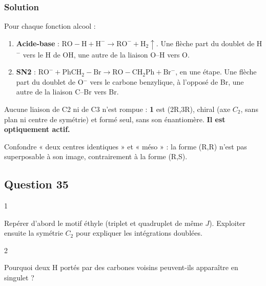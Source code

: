 \documentclass[11pt,a4paper]{article}
\providecommand{\tightlist}{\setlength{\itemsep}{0pt}\setlength{\parskip}{0pt}}
\begin{document}
\hypertarget{solution-33}{%
\subsubsection{Solution}\label{solution-33}}

Pour chaque fonction alcool :

\begin{enumerate}
\def\labelenumi{\arabic{enumi}.}
\tightlist
\item
  \textbf{Acide-base} : \(\mathrm{RO{-}H}+\mathrm{H^-}\to\mathrm{RO^-}+\mathrm{H_2}\uparrow\). Une flèche part du doublet de H\(^-\) vers le H de OH, une autre de la liaison O--H vers O.
\item
  \textbf{SN2} : \(\mathrm{RO^-}+\mathrm{PhCH_2{-}Br}\to\mathrm{RO{-}CH_2Ph}+\mathrm{Br^-}\), en une étape. Une flèche part du doublet de O\(^-\) vers le carbone benzylique, à l'opposé de Br, une autre de la liaison C--Br vers Br.
\end{enumerate}

Aucune liaison de C2 ni de C3 n'est rompue : \textbf{1} est (2R,3R), chiral (axe \(C_2\), sans plan ni centre de symétrie) et formé seul, sans son énantiomère. \textbf{Il est optiquement actif.}

\begin{piege}

Confondre « deux centres identiques » et « méso » : la forme (R,R) n'est pas superposable à son image, contrairement à la forme (R,S).

\end{piege}

\hypertarget{question-35}{%
\subsection{Question 35}\label{question-35}}

\begin{indication}{1}

Repérer d'abord le motif éthyle (triplet et quadruplet de même \(J\)). Exploiter ensuite la symétrie \(C_2\) pour expliquer les intégrations doublées.

\end{indication}

\begin{indication}{2}

Pourquoi deux H portés par des carbones voisins peuvent-ils apparaître en singulet ?

\end{indication}
\end{document}
